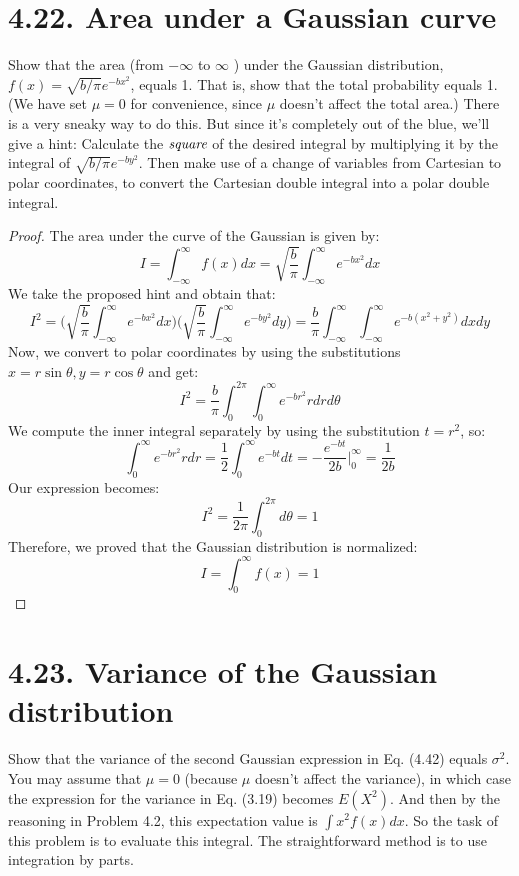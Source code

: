 \section*{4.22. Area under a Gaussian curve}
Show that the area (from $-\infty$ to $\infty$ ) under the Gaussian
distribution, $f(x) = \sqrt{b/\pi} e^{-bx^2}$, equals 1. That is,
show that the total probability equals 1. (We have set
$\mu = 0$ for convenience, since $\mu$ doesn't affect
the total area.) There is a very sneaky way to do this.
But since it's completely out of the blue, we'll give
a hint: Calculate the $\emph{square}$ of the desired integral by multiplying
it by the integral of $\sqrt{b/\pi} e^{-by^2}$. Then make use of a change 
of variables from Cartesian to polar coordinates, to convert
the Cartesian double integral into a polar double integral.

\vspace{1em}

\begin{proof}
    The area under the curve of the Gaussian is given by:
    \[
        I = \int_{-\infty}^\infty f(x) dx = \sqrt{\frac{b}{\pi}} \int_{-\infty}^\infty e^{-bx^2} dx
    \] 
    We take the proposed hint and obtain that:
    \[
        I^2 = \bigg(\sqrt{\frac{b}{\pi}} \int_{-\infty}^\infty e^{-bx^2} dx\bigg)
            \bigg(\sqrt{\frac{b}{\pi}} \int_{-\infty}^\infty e^{-by^2} dy\bigg)
        = \frac{b}{\pi} \int_{-\infty}^\infty \int_{-\infty}^\infty e^{-b(x^2 + y^2)} dxdy
    \] 
    Now, we convert to polar coordinates by using the substitutions
    $x = r\sin \theta, y = r\cos \theta$ and get:
    \[
        I^2 = \frac{b}{\pi} \int_0^{2\pi} \int_0^\infty e^{-br^2} r drd\theta
    \] 
    We compute the inner integral separately by using the substitution
    $t = r^2$, so:
    \[
        \int_0^\infty e^{-br^2}r dr 
        = \frac{1}{2} \int_0^\infty e^{-bt} dt 
        = -\frac{e^{-bt}}{2b} \bigg|_0^\infty
        = \frac{1}{2b}
    \] 
    Our expression becomes:
    \[
        I^2 = \frac{1}{2\pi} \int_0^{2\pi} d\theta = 1
    \] 
    Therefore, we proved that the Gaussian distribution is normalized:
    \[
        I = \int_0^\infty f(x) = 1
    \] 
\end{proof}

\section*{4.23. Variance of the Gaussian distribution}
Show that the variance of the second Gaussian expression in Eq. (4.42)
equals $\sigma^2$. You may assume that $\mu = 0$ (because $\mu$ doesn't
affect the variance), in which case the expression for the variance
in Eq. (3.19) becomes $E(X^2)$. And then by the reasoning in
Problem 4.2, this expectation value is $\int x^2f(x)dx$. So the
task of this problem is to evaluate this integral. The straightforward method
is to use integration by parts.

